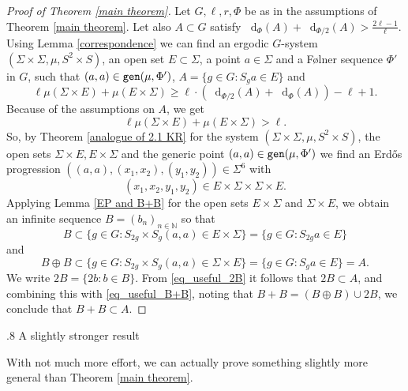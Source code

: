 \documentclass[reqno]{amsart}
\makeatletter
\def\N{{\mathbb N}}
\newcommand*\diff{\mathop{}\!\mathrm{d}}
\theoremstyle{definition}
\theoremstyle{remark}
\def\section{\@startsection{section}{1}%
  \z@{.5\linespacing\@plus.7\linespacing}
{.8\baselineskip}%
  {\normalfont\fontsize{11}{13}\centering\bfseries}%
}
\theoremstyle{remark}
\def\N{{\mathbb N}}
\newcommand{\gen}{\texttt{\textup{gen}}}
\newcommand{\Erdos}{Erd\H{o}s}
\newcommand{\Folner}{F\o{}lner}
\makeatother
\begin{document}
\begin{proof}[Proof of Theorem \ref{main theorem}]
Let $G, \ell, r, \Phi$ be as in the assumptions of Theorem 
\ref{main theorem}. Let also $A\subset G$ satisfy  
$\diff_\Phi(A) + \diff_{\Phi/2}(A) > \frac{2\ell -1}{\ell}.$
Using Lemma \ref{correspondence} we can find an ergodic $G$-system $(\Sigma 
\times \Sigma, \mu, S^2 \times S)$, an open set $E\subset \Sigma$, a point $a\in \Sigma$ and a \Folner{} sequence 
$\Phi'$ in $G$, such that $(a,a)\in \gen(\mu,\Phi')$, $A=\{g\in G\colon S_g a \in E\}$ and 
\begin{equation*}
     \ell\mu(\Sigma\times E) + \mu(E\times\Sigma) 
    \geq \ell \cdot (\diff_{\Phi/2}(A) + \diff_{\Phi}(A) ) - \ell +1.
\end{equation*}
Because of the assumptions on $A$, we get
$$\ell\mu(\Sigma\times E) + \mu(E\times\Sigma) >\ell.$$ 
So, by Theorem \ref{analogue of 2.1 KR} for the system $(\Sigma \times \Sigma, \mu, S^2 \times S)$, the open sets $\Sigma \times E, E \times \Sigma$ and the generic point $(a,a)\in 
\gen(\mu, \Phi ')$ we find an \Erdos{} progression $((a,a), (x_1,x_2), (y_1,y_2)) \in \Sigma ^6 $ with 
$$(x_1, x_2, y_1, y_2)\in E \times \Sigma \times \Sigma \times E.$$
Applying Lemma \ref{EP and B+B} for the open sets $E\times \Sigma$ and 
$\Sigma \times E$, we obtain an infinite sequence $B=(b_n)_{n\in \N}$
so that 
\begin{equation}\label{eq_useful_2B}
    B \subset \{g\in G: S_{2g}\times S_{g} (a,a) \in E\times \Sigma\}
    =\{ g\in G: S_{2g} a \in E \}
\end{equation}
and 
\begin{equation}\label{eq_useful_B+B}
    B \oplus B \subset \{g\in G: S_{2g}\times S_{g} (a,a) \in \Sigma \times E\}
    =\{g\in G: S_{g} a \in E\}=A.
\end{equation}
We write $2B=\{2b: b\in B\}$.
From \eqref{eq_useful_2B} it follows that 
$2B\subset A$, and combining this with \eqref{eq_useful_B+B}, noting that $B+B=
(B \oplus B) \cup 2B$, we conclude that $B+B\subset A$.
\end{proof}

\section{A slightly stronger result}

With not much more effort, we can actually prove something 
slightly more general than Theorem \ref{main theorem}. 
\end{document}

